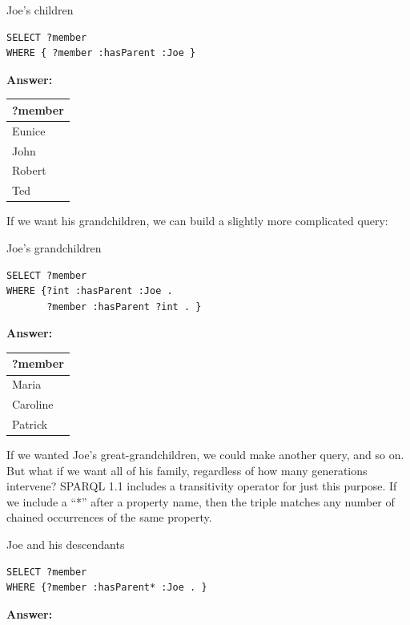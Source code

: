 \begin{query}Joe's children\end{query}

\begin{lstlisting}
SELECT ?member
WHERE { ?member :hasParent :Joe }
\end{lstlisting}

\textbf{\textbf{Answer:}}

\begin{tabular}{|l|}
\hline
?member\\
\hline
Eunice\\
John\\
Robert\\
Ted\\
\hline
\end{tabular}

If we want his grandchildren, we can build a slightly more complicated
query:

\begin{query}Joe's grandchildren\end{query}

\begin{lstlisting}
SELECT ?member
WHERE {?int :hasParent :Joe .
       ?member :hasParent ?int . }
\end{lstlisting}

\textbf{\textbf{Answer:}}

\begin{tabular}{|l|}
\hline
?member\\
\hline
Maria\\
Caroline\\
Patrick\\
\hline
\end{tabular}

If we wanted Joe's great-grandchildren, we could make another query, and
so on. But what if we want all of his family, regardless of how many
generations intervene? SPARQL 1.1 includes a transitivity operator for
just this purpose. If we include a ``*'' after a property name, then the
triple matches any number of chained occurrences of the same property.

\begin{query}Joe and his descendants\end{query}

\begin{lstlisting}
SELECT ?member
WHERE {?member :hasParent* :Joe . }
\end{lstlisting}

\textbf{\textbf{Answer:}}

